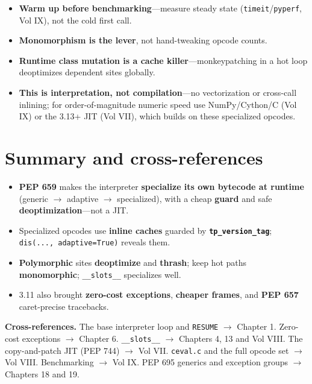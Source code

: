 \begin{itemize}
  \item \textbf{Warm up before benchmarking}---measure steady state (\texttt{timeit}/\texttt{pyperf},
    Vol IX), not the cold first call.
  \item \textbf{Monomorphism is the lever}, not hand-tweaking opcode counts.
  \item \textbf{Runtime class mutation is a cache killer}---monkeypatching in a hot loop deoptimizes
    dependent sites globally.
  \item \textbf{This is interpretation, not compilation}---no vectorization or cross-call inlining;
    for order-of-magnitude numeric speed use NumPy/Cython/C (Vol IX) or the 3.13+ JIT (Vol VII),
    which builds on these specialized opcodes.
\end{itemize}

\section{Summary and cross-references}

\begin{itemize}
  \item \textbf{PEP 659} makes the interpreter \textbf{specialize its own bytecode at runtime}
    (generic $\to$ adaptive $\to$ specialized), with a cheap \textbf{guard} and safe
    \textbf{deoptimization}---not a JIT.
  \item Specialized opcodes use \textbf{inline caches} guarded by \textbf{\texttt{tp\_version\_tag}};
    \texttt{dis(..., adaptive=True)} reveals them.
  \item \textbf{Polymorphic} sites \textbf{deoptimize} and \textbf{thrash}; keep hot paths
    \textbf{monomorphic}; \texttt{\_\_slots\_\_} specializes well.
  \item 3.11 also brought \textbf{zero-cost exceptions}, \textbf{cheaper frames}, and \textbf{PEP
    657} caret-precise tracebacks.
\end{itemize}

\textbf{Cross-references.} The base interpreter loop and \texttt{RESUME} $\rightarrow$ Chapter 1.
Zero-cost exceptions $\rightarrow$ Chapter 6. \texttt{\_\_slots\_\_} $\rightarrow$ Chapters 4, 13 and
Vol VIII. The copy-and-patch JIT (PEP 744) $\rightarrow$ Vol VII. \texttt{ceval.c} and the full
opcode set $\rightarrow$ Vol VIII. Benchmarking $\rightarrow$ Vol IX. PEP 695 generics and exception
groups $\rightarrow$ Chapters 18 and 19.
